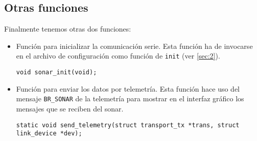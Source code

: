 \subsection{Otras funciones}

 Finalmente tenemos otras dos funciones:
\begin{itemize}
	\item Función para inicializar la comunicación serie. Esta función ha de invocarse en el archivo de configuración como función de \texttt{init} (ver \ref{sec:2}).
	\begin{lstlisting}[style=C]
	void sonar_init(void);
	\end{lstlisting}
	\item Función para enviar los datos por telemetría. Esta función hace uso del mensaje \texttt{BR\_SONAR} de la telemetría para mostrar en el interfaz gráfico los mensajes que se reciben del sonar.
	\begin{lstlisting}[style=C]
	static void send_telemetry(struct transport_tx *trans, struct link_device *dev);
	\end{lstlisting}
\end{itemize}

